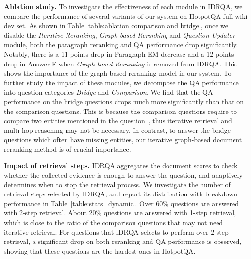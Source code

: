 \documentclass[sigconf]{acmart}
\begin{document}
\BlankLine
\noindent \textbf{Ablation study.}
To investigate the effectiveness of each module in IDRQA, we compare the performance of several variants of our system on HotpotQA full wiki dev set.
As shown in Table \ref{table:ablation comparison and bridge}, once we disable the \emph{Iterative Reranking}, \emph{Graph-based Reranking} and \emph{Question Updater} module, both the paragraph reranking and QA performance drop significantly. Notably, there is a 11 points drop in Paragraph EM decrease and a 12 points drop in Answer F when \emph{Graph-based Reranking} is removed from IDRQA. This shows the importance of the graph-based reranking model in our system.
To further study the impact of these modules, we decompose the QA performance into question categories \textit{Bridge} and \textit{Comparison}. We find that the QA performance on the bridge questions drops much more significantly than that on the comparison questions. This is because the comparison questions require to compare two entities mentioned in the question~\cite{yang-etal-2018-hotpotqa}, thus iterative retrieval and multi-hop reasoning may not be necessary. In contrast, to answer the bridge questions which often have missing entities, our iterative graph-based document reranking method is of crucial importance.























\BlankLine
\noindent \textbf{Impact of retrieval steps.}
IDRQA aggregates the document scores to check whether the collected evidence is enough to answer the question, and adaptively determines when to stop the retrieval process. We investigate the number of retrieval steps selected by IDRQA, and report its distribution with breakdown performance in Table~\ref{table:stats_dynamic}. Over 60\% questions are answered with 2-step retrieval. About 20\% questions are answered with 1-step retrieval, which is close to the ratio of the comparison questions that may not need iterative retrieval. For questions that IDRQA selects to perform over 2-step retrieval, a significant drop on both reranking and QA performance is observed, showing that these questions are the hardest ones in HotpotQA.
\end{document}
